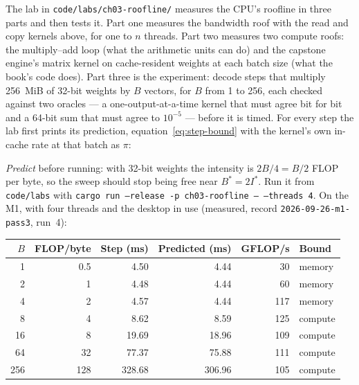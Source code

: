 
The lab in \texttt{code/labs/ch03-roofline/} measures the CPU's roofline in
three parts and then tests it. Part one measures the bandwidth roof with the
read and copy kernels above, for one to $n$ threads. Part two measures two
compute roofs: the multiply--add loop (what the arithmetic units can do) and the
capstone engine's matrix kernel on cache-resident weights at each batch size
(what the book's code does). Part three is the experiment: decode steps that
multiply 256~MiB of 32-bit weights by $B$ vectors, for $B$ from 1 to 256, each
checked against two oracles --- a one-output-at-a-time kernel that must agree
bit for bit and a 64-bit sum that must agree to $10^{-5}$ --- before it is
timed. For every step the lab first prints its prediction,
equation~\eqref{eq:step-bound} with the kernel's own in-cache rate at that batch
as $\pi$:


\noindent \emph{Predict} before running: with 32-bit weights the intensity is
$2B/4 = B/2$ FLOP per byte, so the sweep should stop being free near
$B^{*} = 2I^{*}$. Run it from \texttt{code/labs} with \texttt{cargo run
--release -p ch03-roofline -- --threads 4}. On the M1, with four threads and
the desktop in use (measured, record \texttt{2026-09-26-m1-pass3}, run~4):

\begin{center}\small
\begin{tabular}{@{}rrrrrl@{}}
\toprule
$B$ & FLOP/byte & Step (ms) & Predicted (ms) & GFLOP/s & Bound \\
\midrule
1 & 0.5 & 4.50 & 4.44 & 30 & memory \\
2 & 1 & 4.48 & 4.44 & 60 & memory \\
4 & 2 & 4.57 & 4.44 & 117 & memory \\
8 & 4 & 8.62 & 8.59 & 125 & compute \\
16 & 8 & 19.69 & 18.96 & 109 & compute \\
64 & 32 & 77.37 & 75.88 & 111 & compute \\
256 & 128 & 328.68 & 306.96 & 105 & compute \\
\bottomrule
\end{tabular}
\end{center}


